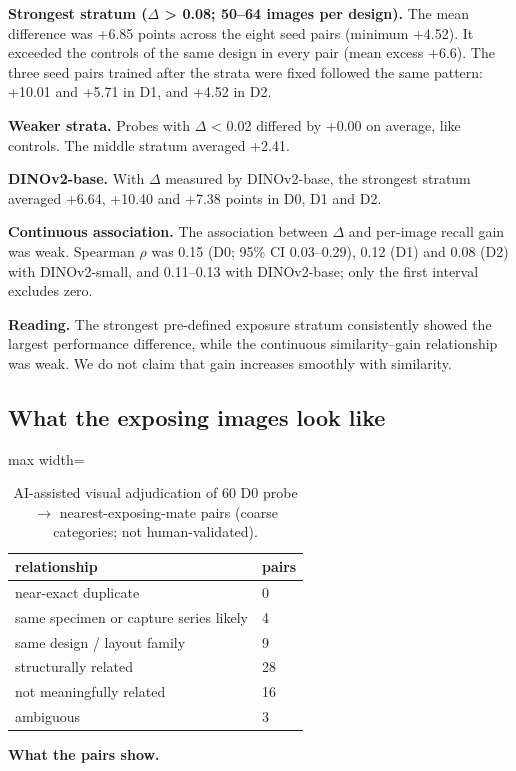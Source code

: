 \documentclass[11pt]{article}
\begin{document}
\textbf{Strongest stratum ($\Delta$ > 0.08; 50--64 images per design).} The mean difference was +6.85 points across the eight seed pairs (minimum +4.52). It exceeded the controls of the same design in every pair (mean excess +6.6). The three seed pairs trained after the strata were fixed followed the same pattern: +10.01 and +5.71 in D1, and +4.52 in D2.

\textbf{Weaker strata.} Probes with $\Delta$ < 0.02 differed by +0.00 on average, like controls. The middle stratum averaged +2.41.

\textbf{DINOv2-base.} With $\Delta$ measured by DINOv2-base, the strongest stratum averaged +6.64, +10.40 and +7.38 points in D0, D1 and D2.

\textbf{Continuous association.} The association between $\Delta$ and per-image recall gain was weak. Spearman $\rho$ was 0.15 (D0; 95\% CI 0.03--0.29), 0.12 (D1) and 0.08 (D2) with DINOv2-small, and 0.11--0.13 with DINOv2-base; only the first interval excludes zero.

\textbf{Reading.} The strongest pre-defined exposure stratum consistently showed the largest performance difference, while the continuous similarity--gain relationship was weak. We do not claim that gain increases smoothly with similarity.

\subsection{What the exposing images look like}
\begin{table}[htbp]\centering\small
\caption{AI-assisted visual adjudication of 60 D0 probe $\rightarrow$ nearest-exposing-mate pairs (coarse categories; not human-validated).}
\begin{adjustbox}{max width=\linewidth}
\begin{tabular}{ll}
\toprule
relationship & pairs \\ \midrule
near-exact duplicate & 0 \\
same specimen or capture series likely & 4 \\
same design / layout family & 9 \\
structurally related & 28 \\
not meaningfully related & 16 \\
ambiguous & 3 \\
\bottomrule
\end{tabular}
\end{adjustbox}
\end{table}
\textbf{What the pairs show.}
\end{document}

